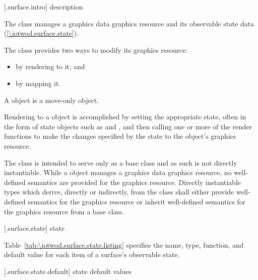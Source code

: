  [\iotwod.surface.intro] { description}

\pnum
{}
The  class manages a graphics
data graphics resource and its observable state data
(\ref{\iotwod.surface.state}).

\pnum
The  class provides two ways to modify its graphics resource:
\begin{itemize}
\item by rendering to it; and
\item by mapping it.
\end{itemize}

\pnum
A  object is a move-only object.

\pnum
Rendering to a  object is accomplished by setting the appropriate state, often in the form of state objects such as  and , and then calling one or more of the render functions to make the changes specified by the state to the  object's graphics resource.

\pnum
The  class is intended to serve only as a base class and as such is not directly instantiable. While a  object manages a graphics data graphics resource, no well-defined semantics are provided for the graphics resource. Directly instantiable types which derive, directly or indirectly, from the  class shall either provide well-defined semantics for the graphics resource or inherit well-defined semantics for the graphics resource from a base class.

 [\iotwod.surface.state] { state}

\pnum
Table~\ref{tab:\iotwod.surface.state.listing} specifies the name, type, function, and default value for each item of a surface's observable state.

 [\iotwod.surface.state.default] { state default values}

